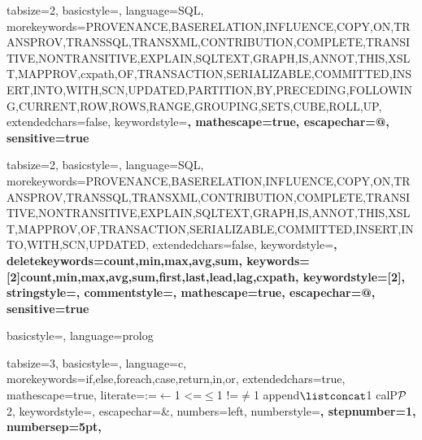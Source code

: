 \documentclass[11pt]{article}
\numberwithin{theo}{section}
\numberwithin{exam}{section}
\numberwithin{defi}{section}
\begin{document}




{
tabsize=2,
basicstyle=\small\upshape\ttfamily,
language=SQL,
morekeywords={PROVENANCE,BASERELATION,INFLUENCE,COPY,ON,TRANSPROV,TRANSSQL,TRANSXML,CONTRIBUTION,COMPLETE,TRANSITIVE,NONTRANSITIVE,EXPLAIN,SQLTEXT,GRAPH,IS,ANNOT,THIS,XSLT,MAPPROV,cxpath,OF,TRANSACTION,SERIALIZABLE,COMMITTED,INSERT,INTO,WITH,SCN,UPDATED,PARTITION,BY,PRECEDING,FOLLOWING,CURRENT,ROW,ROWS,RANGE,GROUPING,SETS,CUBE,ROLL,UP},
extendedchars=false,
keywordstyle=\bfseries,
mathescape=true,
escapechar=@,
sensitive=true
}


{
tabsize=2,
basicstyle=\small\upshape\ttfamily,
language=SQL,
morekeywords={PROVENANCE,BASERELATION,INFLUENCE,COPY,ON,TRANSPROV,TRANSSQL,TRANSXML,CONTRIBUTION,COMPLETE,TRANSITIVE,NONTRANSITIVE,EXPLAIN,SQLTEXT,GRAPH,IS,ANNOT,THIS,XSLT,MAPPROV,OF,TRANSACTION,SERIALIZABLE,COMMITTED,INSERT,INTO,WITH,SCN,UPDATED},
extendedchars=false,
keywordstyle=\bfseries\color{lstpurple},
deletekeywords={count,min,max,avg,sum},
keywords=[2]{count,min,max,avg,sum,first,last,lead,lag,cxpath},
keywordstyle=[2]\color{lstblue},
stringstyle=\color{lstreddark},
commentstyle=\color{lstgreen},
mathescape=true,
escapechar=@,
sensitive=true
}


{
basicstyle=\footnotesize\upshape\ttfamily,
language=prolog
}




{
  tabsize=3,
  basicstyle=\small,
  language=c,
  morekeywords={if,else,foreach,case,return,in,or},
  extendedchars=true,
  mathescape=true,
  literate={:=}{{$\gets$}}1 {<=}{{$\leq$}}1 {!=}{{$\neq$}}1 {append}{{$\listconcat$}}1 {calP}{{$\cal P$}}{2},
  keywordstyle=\color{lstpurple},
  escapechar=&,
  numbers=left,
  numberstyle=\color{lstgreen}\small\bfseries,
  stepnumber=1,
  numbersep=5pt,
}
\end{document}
